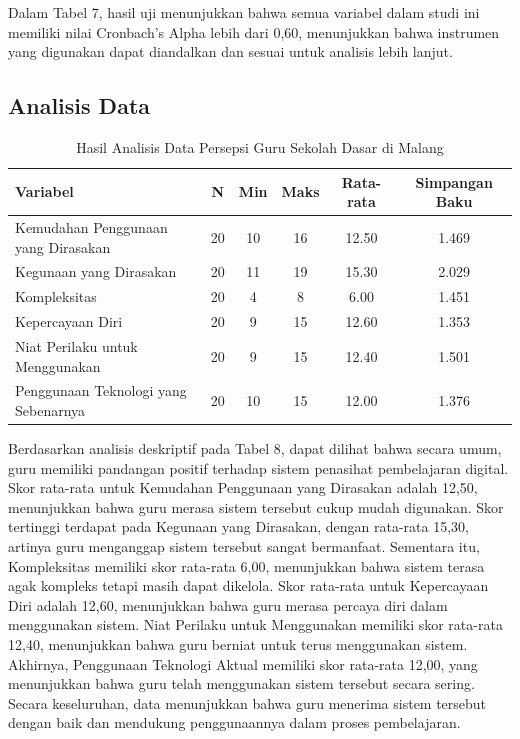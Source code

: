     Dalam Tabel 7, hasil uji menunjukkan bahwa semua variabel dalam studi ini memiliki nilai Cronbach’s Alpha lebih dari 0,60, menunjukkan bahwa instrumen yang digunakan dapat diandalkan dan sesuai untuk analisis lebih lanjut.
    
\subsection{Analisis Data}

    \begin{table}[H]
        \centering
        \caption{Hasil Analisis Data Persepsi Guru Sekolah Dasar di Malang}
        \label{tab:analisis-data-guru}
        \begin{tabularx}{\textwidth}{p{6cm}ccccc}
            \toprule
            \textbf{Variabel} & \textbf{N} & \textbf{Min} & \textbf{Maks} & \textbf{Rata-rata} & \textbf{Simpangan Baku} \\
            \midrule
            Kemudahan Penggunaan yang Dirasakan & 20 & 10 & 16 & 12.50 & 1.469 \\
            Kegunaan yang Dirasakan              & 20 & 11 & 19 & 15.30 & 2.029 \\
            Kompleksitas                         & 20 & 4  & 8  & 6.00  & 1.451 \\
            Kepercayaan Diri                     & 20 & 9  & 15 & 12.60 & 1.353 \\
            Niat Perilaku untuk Menggunakan      & 20 & 9  & 15 & 12.40 & 1.501 \\
            Penggunaan Teknologi yang Sebenarnya & 20 & 10 & 15 & 12.00 & 1.376 \\
            \bottomrule
        \end{tabularx}
    \end{table}

    Berdasarkan analisis deskriptif pada Tabel 8, dapat dilihat bahwa secara umum, guru memiliki pandangan positif terhadap sistem penasihat pembelajaran digital. Skor rata-rata untuk Kemudahan Penggunaan yang Dirasakan adalah 12,50, menunjukkan bahwa guru merasa sistem tersebut cukup mudah digunakan. Skor tertinggi terdapat pada Kegunaan yang Dirasakan, dengan rata-rata 15,30, artinya guru menganggap sistem tersebut sangat bermanfaat. Sementara itu, Kompleksitas memiliki skor rata-rata 6,00, menunjukkan bahwa sistem terasa agak kompleks tetapi masih dapat dikelola. Skor rata-rata untuk Kepercayaan Diri adalah 12,60, menunjukkan bahwa guru merasa percaya diri dalam menggunakan sistem. Niat Perilaku untuk Menggunakan memiliki skor rata-rata 12,40, menunjukkan bahwa guru berniat untuk terus menggunakan sistem. Akhirnya, Penggunaan Teknologi Aktual memiliki skor rata-rata 12,00, yang menunjukkan bahwa guru telah menggunakan sistem tersebut secara sering. Secara keseluruhan, data menunjukkan bahwa guru menerima sistem tersebut dengan baik dan mendukung penggunaannya dalam proses pembelajaran.

